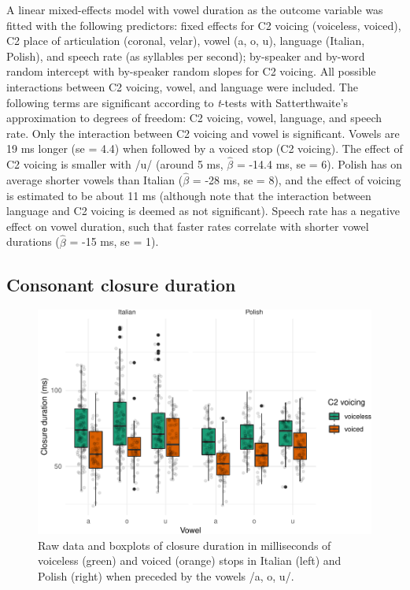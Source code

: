 \documentclass[preprint]{JASAnew}
\begin{document}
A linear mixed-effects model with vowel duration as the outcome variable
was fitted with the following predictors: fixed effects for C2 voicing
(voiceless, voiced), C2 place of articulation (coronal, velar), vowel
(a, o, u), language (Italian, Polish), and speech rate (as syllables per
second); by-speaker and by-word random intercept with by-speaker random
slopes for C2 voicing. All possible interactions between C2 voicing,
vowel, and language were included. The following terms are significant
according to \emph{t}-tests with Satterthwaite's approximation to
degrees of freedom: C2 voicing, vowel, language, and speech rate. Only
the interaction between C2 voicing and vowel is significant. Vowels are
19 ms longer (se = 4.4) when followed by a voiced stop (C2 voicing). The
effect of C2 voicing is smaller with /u/ (around 5 ms, \(\hat{\beta}\) =
-14.4 ms, se = 6). Polish has on average shorter vowels than Italian
(\(\hat{\beta}\) = -28 ms, se = 8), and the effect of voicing is
estimated to be about 11 ms (although note that the interaction between
language and C2 voicing is deemed as not significant). Speech rate has a
negative effect on vowel duration, such that faster rates correlate with
shorter vowel durations (\(\hat{\beta}\) = -15 ms, se = 1).

\hypertarget{consonant-closure-duration}{%
\subsection{Consonant closure
duration}\label{consonant-closure-duration}}

\begin{figure}
\includegraphics[width=\linewidth]{2018-jasa_files/figure-latex/closure-plot-1} \caption{Raw data and boxplots of closure duration in milliseconds of voiceless (green) and voiced (orange) stops in Italian (left) and Polish (right) when preceded by the vowels /a, o, u/.}\label{f:closure-plot}
\end{figure}
\end{document}

